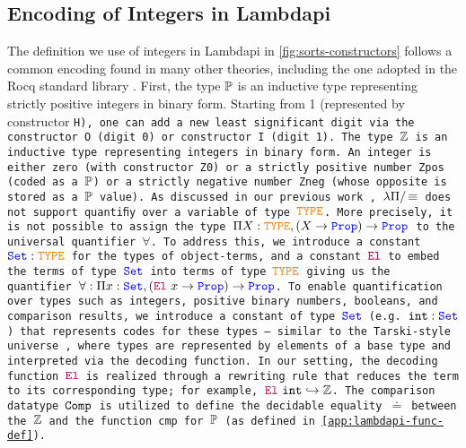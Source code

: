 \subsection{Encoding of Integers in Lambdapi}
The definition we use of integers in Lambdapi in \cref{fig:sorts-constructors} follows a common encoding found in many other theories, including the one adopted in the Rocq standard library \cite{Rocq-refman}.
First, the type $\bb{P}$  is an inductive type representing strictly positive integers in binary form.
Starting from 1 (represented by constructor \tt{H}), one can add a new least significant digit via the constructor \tt{O} (digit 0) or constructor \tt{I} (digit 1). 
The type $\bb{Z}$ is an inductive type representing integers in binary form.
An integer is either zero (with constructor \tt{Z0}) or a strictly positive number \tt{Zpos} (coded as a $\bb{P}$) or a strictly negative number \tt{Zneg} (whose opposite is stored as a $\bb{P}$ value).
%
As discussed in our previous work \cite{ColtellacciMD24}, $\lpm$ does not support quantiﬁy over a variable of type $\type$. More precisely, it is not possible to assign the type $\Pi X : \type,(X \ra \prop) \ra \prop$ to the universal quantifier $\forall$.
To address this, we introduce a constant $\set : \type$ for the types of object-terms, and a constant ${\el}$ to embed the terms of type $\set$ into terms of type $\type$ giving us the quantifier $\forall: \Pi x: \set, (\el~x \ra \prop) \ra \prop$.
To enable quantification over types such as integers, positive binary numbers, booleans, and comparison results, we introduce a constant of type $\set$ (e.g. $\tt{int}: \set$) that represents codes for these types — similar to the Tarski-style universe \cite[\S Universes]{intuitype},
where types are represented by elements of a base type and interpreted via the decoding function. In our setting, the decoding function $\el$  is realized through a rewriting rule that reduces the term to its corresponding type; for example, $\el~\tt{int} \re \bb{Z}$.
The comparison datatype $\tt{Comp}$ is utilized to define the decidable equality $\doteq$ between the $\bb{Z}$ and the function \tt{cmp} for $\bb{P}$ (as defined in \cref{app:lambdapi-func-def}).

